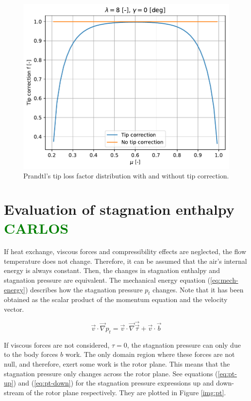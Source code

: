 \begin{figure}[htbp]
	\centering
	\includegraphics[height=0.45\textheight]{./img/tip-correction/f.pdf}
	\caption{Prandtl's tip loss factor distribution with and without tip correction.}
	\label{img:tc-f}
\end{figure}


\section{Evaluation of stagnation enthalpy \textcolor{green}{CARLOS}}

If heat exchange, viscous forces and compressibility effects are neglected, the flow temperature does not change. Therefore, it can be assumed that the air's internal energy is always constant. Then, the changes in stagnation enthalpy and stagnation pressure are equivalent. The mechanical energy equation (\ref{eq:mech-energy}) describes how the stagnation pressure $ p_t $ changes. Note that it has been obtained as the scalar product of the momentum equation and the velocity vector.

\begin{equation}
	\vec{v} \cdot \vec{\nabla} p_t = \vec{v} \cdot \vec{\nabla} \vec{\vec{\tau}} + \vec{v} \cdot \vec{b}
	\label{eq:mech-energy}
\end{equation}

If viscous forces are not considered, $ \tau = 0 $, the stagnation pressure can only due to the body forces $ b $ work. The only domain region where these forces are not null, and therefore, exert some work is the rotor plane. This means that the stagnation pressure only changes across the rotor plane. See equations (\ref{eq:pt-up}) and (\ref{eq:pt-down}) for the stagnation pressure expressions up and down-stream of the rotor plane respectively. They are plotted in Figure \ref{img:pt}.

